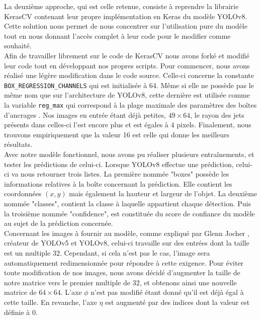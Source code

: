 La deuxième approche, qui est celle retenue, consiste à reprendre la librairie KerasCV \cite{noauthor_kerascv_2023} contenant leur propre implémentation en Keras du modèle YOLOv8. Cette solution nous permet de nous concentrer sur l'utilisation pure du modèle tout en nous donnant l'accès complet à leur code pour le modifier comme souhaité.\\

Afin de travailler librement sur le code de KerasCV nous avons forké et modifié leur code tout en développant nos propres scripts. Pour commencer, nous avons réalisé une légère modification dans le code source. Celle-ci concerne la constante \verb|BOX_REGRESSION_CHANNELS| qui est initialisée à 64. Même si elle ne possède pas le même nom que sur l'architecture de YOLOv8, cette dernière est utilisée comme la variable \verb|reg_max| qui correspond à la plage maximale des paramètres des boîtes d'ancrages \cite{noauthor_what_nodate}. Nos images en entrée étant déjà petites, $49 \times 64$, le rayon des jets présents dans celles-ci l'est encore plus et est égales à $4$ pixels. Finalement, nous trouvons empiriquement que la valeur 16 est celle qui donne les meilleurs résultats.\\

Avec notre modèle fonctionnel, nous avons pu réaliser plusieurs entraînements, et tester les prédictions de celui-ci. Lorsque YOLOv8 effectue une prédiction, celui-ci va nous retourner trois listes. La première nommée "boxes" possède les informations relatives à la boîte concernant la prédiction. Elle contient les coordonnées $(x, y)$ mais également la hauteur et largeur de l'objet. La deuxième nommée "classes", contient la classe à laquelle appartient chaque détection. Puis la troisième nommée "confidence", est constituée du score de confiance du modèle au sujet de la prédiction concernée.\\

Concernant les images à fournir au modèle, comme expliqué par Glenn Jocher \cite{noauthor_image_nodate}, créateur de YOLOv5 et YOLOv8, celui-ci travaille sur des entrées dont la taille est un multiple $32$. Cependant, si cela n'est pas le cas, l'image sera automatiquement redimensionnée pour répondre à cette exigence. Pour éviter toute modification de nos images, nous avons décidé d'augmenter la taille de notre matrice vers le premier multiple de $32$, et obtenons ainsi une nouvelle matrice de $64 \times 64$. L'axe $\phi$ n'est pas modifié étant donné qu'il est déjà égal à cette taille. En revanche, l'axe $\eta$ est augmenté par des indices dont la valeur est définie à $0$.\\

